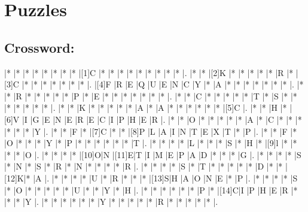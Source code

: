\documentclass{article}
\begin{document}
\section*{Puzzles}

\subsection*{Crossword:}

\begin{Puzzle}{18}{18} %
|*    |*    |*    |*    |*    |*    |*    |*    |[1]C |*    |*    |*    |*    |*    |*    |*    |*    |*    |.
|*    |*    |[2]K |*    |*    |*    |*    |*    |R    |*    |[3]C |*    |*    |*    |*    |*    |*    |*    |.
|[4]F |R    |E    |Q    |U    |E    |N    |C    |Y    |*    |A    |*    |*    |*    |*    |*    |*    |*    |.
|*    |*    |R    |*    |*    |*    |*    |*    |P    |*    |E    |*    |*    |*    |*    |*    |*    |*    |.
|*    |*    |C    |*    |*    |*    |*    |*    |T    |*    |S    |*    |*    |*    |*    |*    |*    |*    |.
|*    |*    |K    |*    |*    |*    |*    |*    |A    |*    |A    |*    |*    |*    |*    |*    |*    |[5]C |.
|*    |*    |H    |*    |[6]V |I    |G    |E    |N    |E    |R    |E    |C    |I    |P    |H    |E    |R    |.
|*    |*    |O    |*    |*    |*    |*    |*    |A    |*    |C    |*    |*    |*    |*    |*    |*    |Y    |.
|*    |*    |F    |*    |[7]C |*    |*    |[8]P |L    |A    |I    |N    |T    |E    |X    |T    |*    |P    |.
|*    |*    |F    |*    |O    |*    |*    |*    |Y    |*    |P    |*    |*    |*    |*    |*    |*    |T    |.
|*    |*    |*    |*    |L    |*    |*    |*    |S    |*    |H    |*    |[9]l |*    |*    |*    |*    |O    |.
|*    |*    |*    |*    |[10]O|N    |[11]E|T    |I    |M    |E    |P    |A    |D    |*    |*    |*    |G    |.
|*    |*    |*    |*    |S    |*    |N    |*    |S    |*    |R    |*    |N    |*    |*    |*    |*    |R    |.
|*    |*    |*    |*    |S    |*    |T    |*    |*    |*    |*    |*    |D    |*    |*    |[12]K|*    |A    |.
|*    |*    |*    |*    |U    |*    |R    |*    |*    |*    |[13]S|H    |A    |O    |N    |E    |*    |P    |.
|*    |*    |*    |*    |S    |*    |O    |*    |*    |*    |*    |*    |U    |*    |*    |Y    |*    |H    |.
|*    |*    |*    |*    |*    |*    |P    |*    |[14]C|I    |P    |H    |E    |R    |*    |*    |*    |Y    |.
|*    |*    |*    |*    |*    |*    |Y    |*    |*    |*    |*    |*    |R    |*    |*    |*    |*    |*    |.
\end{Puzzle}
\end{document}
